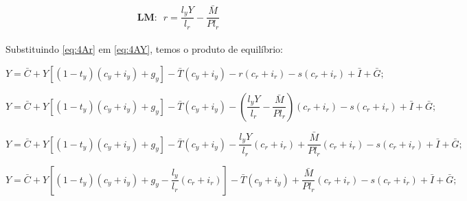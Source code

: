 \documentclass{article}
\begin{document}
\begin{equation}\label{eq:4Ar}
\textbf{LM:} \>\>\> r = \frac{l_yY}{l_r} - \frac{\bar{M}}{Pl_r}    
\end{equation}
\\
Substituindo \eqref{eq:4Ar} em \eqref{eq:4AY}, temos o produto de equilíbrio:

\begin{equation}
Y=\bar{C}+Y\left[(1-t_y)(c_y+i_y)+g_y\right]-\bar{T}(c_y+i_y) - r(c_r+i_r)-s(c_r+i_r) +\bar{I} +\bar{G};
\end{equation}

\begin{equation}
Y=\bar{C}+Y\left[(1-t_y)(c_y+i_y)+g_y\right]-\bar{T}(c_y+i_y) - \left(\frac{l_yY}{l_r} - \frac{\bar{M}}{Pl_r}\right)(c_r+i_r)-s(c_r+i_r) +\bar{I} +\bar{G};
\end{equation}

\begin{equation}
Y=\bar{C}+Y\left[(1-t_y)(c_y+i_y)+g_y\right]-\bar{T}(c_y+i_y) - \frac{l_yY}{l_r}(c_r+i_r) + \frac{\bar{M}}{Pl_r}(c_r+i_r)-s(c_r+i_r) +\bar{I} +\bar{G};
\end{equation}

\begin{equation}
Y=\bar{C}+Y\left[(1-t_y)(c_y+i_y)+g_y - \frac{l_y}{l_r}(c_r+i_r)\right]-\bar{T}(c_y+i_y) + \frac{\bar{M}}{Pl_r}(c_r+i_r)-s(c_r+i_r) +\bar{I} +\bar{G};
\end{equation}
\end{document}

